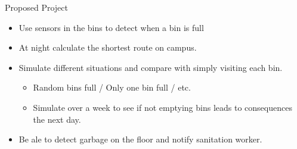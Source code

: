 \documentclass[24pt]{beamer}
\begin{document}
    \begin{frame}{Proposed Project}
        \begin{itemize}
            \item Use sensors in the bins to detect when a bin is full \pause
            \item At night calculate the shortest route on campus. \pause
            \item Simulate different situations and compare with simply visiting each bin. \pause
                \begin{itemize}
                     \item Random bins full / Only one bin full / etc.\pause
                     \item Simulate over a week to see if not emptying bins leads to consequences the next day. \pause
                \end{itemize}
            \item Be ale to detect garbage on the floor and notify sanitation worker.
        
        \end{itemize}
    \end{frame}
\end{document}
